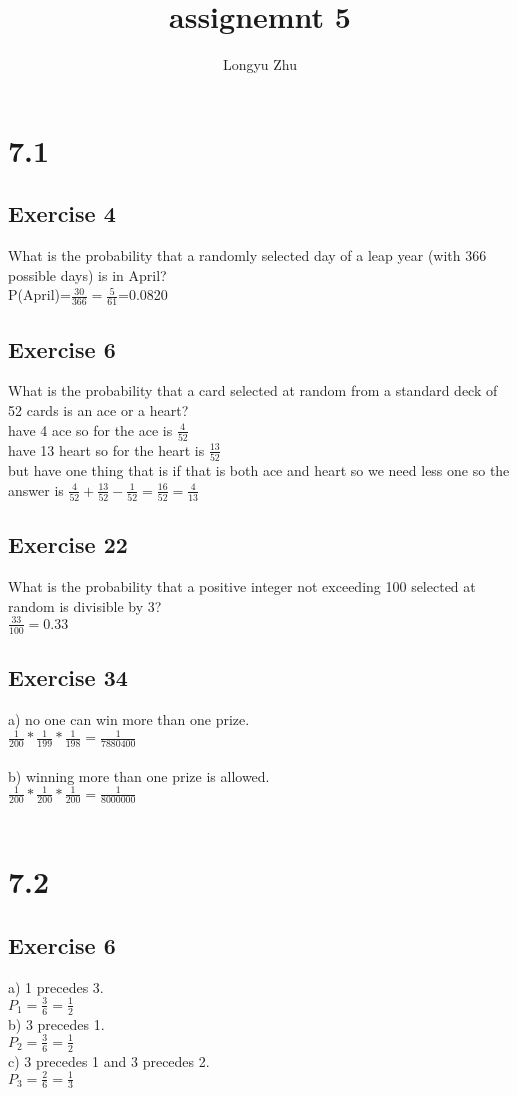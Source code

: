 \documentclass[12pt]{article}
\title{assignemnt 5}
\author{Longyu Zhu}
\begin{document}
\section*{7.1}
\subsection*{Exercise 4}
What is the probability that a randomly selected day of a leap year (with 366 possible days) is in April?\\
P(April)=$\frac{30}{366}=\frac{5}{61}$=0.0820\\
\subsection*{Exercise 6}
What is the probability that a card selected at random from a standard deck of 52 cards is an ace or a heart?\\
have 4 ace so for the ace is $\frac{4}{52}$\\
have 13 heart so for the heart is $\frac{13}{52}$\\
but have one thing that is if that is both ace and heart so we need less one so the answer is $\frac{4}{52}+\frac{13}{52}-\frac{1}{52}=\frac{16}{52}=\frac{4}{13}$\\
\subsection*{Exercise 22}
What is the probability that a positive integer not exceeding 100 selected at random is divisible by 3?\\
$\frac{33}{100}=0.33$
\subsection*{Exercise 34}
a) no one can win more than one prize.\\
$\frac{1}{200}*\frac{1}{199}*\frac{1}{198}=\frac{1}{7880400}$\\
\\
b) winning more than one prize is allowed.\\
$\frac{1}{200}*\frac{1}{200}*\frac{1}{200}=\frac{1}{8000000}$\\
\\
\section*{7.2}
\subsection*{Exercise 6}
a) 1 precedes 3.\\
$P_1=\frac{3}{6}=\frac{1}{2}$\\
b) 3 precedes 1.\\
$P_2=\frac{3}{6}=\frac{1}{2}$\\
c) 3 precedes 1 and 3 precedes 2.\\
$P_3=\frac{2}{6}=\frac{1}{3}$\\
\end{document}
